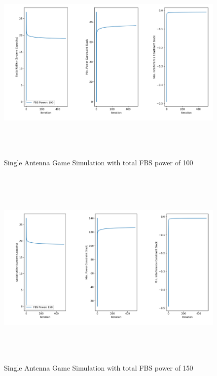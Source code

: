 \documentclass[12pt,a4paper]{report}
\begin{document}
\begin{figure}[H]\label{single_power1}
	\includegraphics[width= 15cm,height = 10cm]{figures/single_power1}
	  \caption{Single Antenna Game Simulation with total FBS power of 100}
\end{figure}
\begin{figure}[H]\label{single_power2}
	\includegraphics[width= 15cm,height = 10cm]{figures/single_power2}
	  \caption{Single Antenna Game Simulation with total FBS power of 150}
\end{figure}
\end{document}
